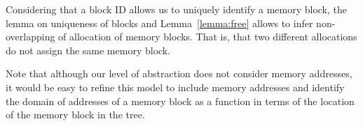 
Considering that a block ID allows us to uniquely identify a memory block, the lemma on uniqueness of blocks and Lemma~\ref{lemma:free} allows to infer non-overlapping of allocation of memory blocks. That is, that two different allocations do not assign the same memory block.

Note that although our level of abstraction does not consider memory addresses, it would be easy to refine this model to include memory addresses and identify the domain of addresses of a memory block as a function in terms of the location of the memory block in the tree. 

